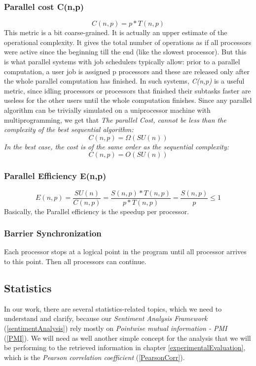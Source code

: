  \subsubsection{Parallel cost C(n,p)}\label{ParCost}
	\[C(n,p) = p * T(n,p) \] 
	This metric is a bit coarse-grained. It is actually an upper estimate of the operational complexity. It gives the total number of operations as if all processors were active since the beginning till the end (like the slowest processor). But this is what parallel systems with job schedulers typically allow: prior to a parallel computation, a user job is assigned p processors and these are released only after the whole parallel computation has finished. In such systems, \emph{C(n,p)} is a useful metric, since idling processors or processors that finished their subtasks faster are useless for the other users until the whole computation finishes. Since any parallel algorithm can be trivially simulated on a uniprocessor machine with multiprogramming, we get that \emph{The parallel Cost, cannot be less than the complexity of the best sequential algorithm:}
	\[C(n,p) = \Omega(SU(n)) \] 
	\emph{In the best case, the cost is of the same order as the sequential complexity:}
	\[C(n,p) = O(SU(n)) \] 
	
 \subsubsection{Parallel Efficiency E(n,p)}\label{ParEfficiency}
	\[E(n,p) = \frac{SU(n)}{C(n,p)} = \frac{S(n,p) * T(n,p)}{p * T(n,p)} =  \frac{S(n,p)}{p} \leq 1 \] 
	Basically, the Parallel efficiency is the speedup per processor.

 \subsubsection{Barrier Synchronization}\label{BarrierSynchronization}
	Each processor stops at a logical point in the program until all processor arrives to this point. Then all processors can continue.

\clearpage
\subsection{Statistics}\label{statistics}

In our work, there are several statistics-related topics, which we need to understand and clarify, because our \emph{Sentiment Analysis Framework} (\ref{sentimentAnalysis}) rely mostly on \emph{Pointwise mutual information - PMI} (\ref{PMI}). We will need as well another simple concept for the analysis that we will be performing to the retrieved information in chapter \ref{experimentalEvaluation}, which is the \emph{Pearson correlation coefficient} (\ref{PearsonCorr}).

